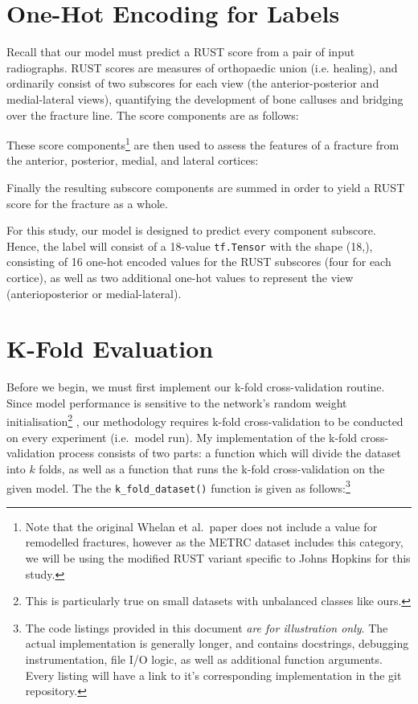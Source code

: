 \section{One-Hot Encoding for Labels}

Recall that our model must predict a RUST score from a pair of input radiographs. RUST scores are measures of orthopaedic union (i.e. healing), and ordinarily consist of two subscores for each view (the anterior-posterior and medial-lateral views), quantifying the development of bone calluses and bridging over the fracture line. The score components are as follows:



\noindent
These score components\footnote{Note that the original Whelan et al.\ paper \autocite{Whelan2010} does not include a value for remodelled fractures, however as the METRC dataset includes this category, we will be using the modified RUST variant specific to Johns Hopkins for this study.} are then used to assess the features of a fracture from the anterior, posterior, medial, and lateral cortices:



\noindent
Finally the resulting subscore components are summed in order to yield a RUST score for the fracture as a whole.


For this study, our model is designed to predict every component subscore. Hence, the label will consist of a 18-value \texttt{tf.Tensor} with the shape (18,), consisting of 16 one-hot encoded values for the RUST subscores (four for each cortice), as well as two additional one-hot values to represent the view (anterioposterior or medial-lateral).

\section{K-Fold Evaluation}

Before we begin, we must first implement our k-fold cross-validation routine. Since model performance is sensitive to the network's random weight initialisation\footnote{This is particularly true on small datasets with unbalanced classes like ours.} \autocite{Narkhede2022}, our methodology requires k-fold cross-validation to be conducted on every experiment (i.e.\ model run). My implementation of the k-fold cross-validation process consists of two parts: a function which will divide the dataset into \(k\) folds, as well as a function that runs the k-fold cross-validation on the given model. The the \texttt{k_fold_dataset()} function is given as follows:\footnote{The code listings provided in this document \emph{are for illustration only}. The actual implementation is generally longer, and contains docstrings, debugging instrumentation, file I/O logic, as well as additional function arguments. Every listing will have a link to it's corresponding implementation in the git repository.}

